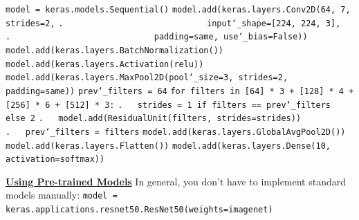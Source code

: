 \texttt{model = keras.models.Sequential()}\newline
\texttt{model.add(keras.layers.Conv2D(64, 7, strides=2,}\newline
\texttt{.~~~~~~~~~~~~~~~~~~~~~~~~~~~~~input\char`_shape=[224, 224, 3],}\newline
\texttt{.~~~~~~~~~~~~~~~~~~~~~~~~~~~~~padding=\textquotesingle same\textquotesingle, use\char`_bias=False))}\newline
\texttt{model.add(keras.layers.BatchNormalization())}\newline
\texttt{model.add(keras.layers.Activation(\textquotesingle relu\textquotesingle))}\newline
\texttt{model.add(keras.layers.MaxPool2D(pool\char`_size=3, strides=2, padding=\textquotesingle same\textquotesingle))}\newline
\texttt{prev\char`_filters = 64}\newline
\texttt{for filters in [64] * 3 + [128] * 4 + [256] * 6 + [512] * 3:}\newline
\texttt{.~~~strides = 1 if filters == prev\char`_filters else 2}\newline
\texttt{.~~~model.add(ResidualUnit(filters, strides=strides))}\newline
\texttt{.~~~prev\char`_filters = filters}\newline
\texttt{model.add(keras.layers.GlobalAvgPool2D())}\newline
\texttt{model.add(keras.layers.Flatten())}\newline
\texttt{model.add(keras.layers.Dense(10, activation=\textquotesingle softmax\textquotesingle))}

\newpage
\textbf{\underline{Using Pre-trained Models}}\newline
In general, you don't have to implement standard models manually:\newline
\texttt{model = keras.applications.resnet50.ResNet50(weights=\textquotesingle imagenet\textquotesingle)}

